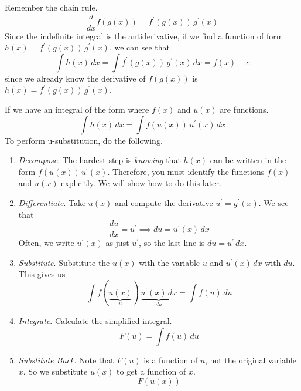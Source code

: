 \documentclass{article}
\begin{document}
  Remember the chain rule. 
  \begin{equation}
    \frac{d}{dx} f(g(x)) = f^\prime (g(x)) \, g^\prime (x)
  \end{equation}
  Since the indefinite integral is the antiderivative, if we find a function of form $h(x) = f^\prime (g(x)) \, g^\prime (x)$, we can see that 
  \begin{equation}
    \int h(x) \,dx = \int f^\prime (g(x)) \, g^\prime (x) \,dx = f(x) + c
  \end{equation} 
  since we already know the derivative of $f(g(x))$ is $h(x) = f^\prime (g(x)) \, g^\prime(x)$. 

  \begin{definition}
    If we have an integral of the form where $f(x)$ and $u(x)$ are functions. 
    \begin{equation}
      \int h(x) \,dx = \int f(u(x)) \, u^\prime(x) \,dx
    \end{equation} 
    To perform u-substitution, do the following. 
    \begin{enumerate}
      \item \textit{Decompose}. The hardest step is \textit{knowing} that $h(x)$ can be written in the form $f(u(x)) \, u^\prime (x)$. Therefore, you must identify the functions $f(x)$ and $u(x)$ explicitly. We will show how to do this later. 

      \item \textit{Differentiate}. Take $u(x)$ and compute the derivative $u^\prime = g^\prime (x)$. We see that 
      \begin{equation}
        \frac{du}{dx} = u^\prime \implies du = u^\prime (x) \,dx
      \end{equation} 
      Often, we write $u^\prime (x)$ as just $u^\prime$, so the last line is $du = u^\prime \,dx$. 

      \item \textit{Substitute}. Substitute the $u(x)$ with the variable $u$ and $u^\prime (x) \,dx$ with $du$. This gives us 
      \begin{equation}
        \int f(\underbrace{u(x)}_{u}) \, \underbrace{u^\prime(x) \,dx}_{du} = \int f(u) \,du
      \end{equation} 

      \item \textit{Integrate}. Calculate the simplified integral. 
      \begin{equation}
        F(u) = \int f(u) \,du
      \end{equation}

      \item \textit{Substitute Back}. Note that $F(u)$ is a function of $u$, not the original variable $x$. So we substitute $u(x)$ to get a function of $x$. 
      \begin{equation}
        F(u(x))
      \end{equation}
    \end{enumerate}
  \end{definition}
\end{document}
